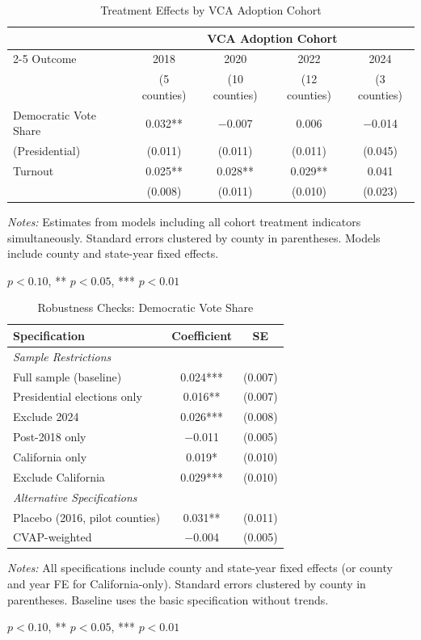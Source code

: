\begin{table}[htbp]
\centering
\caption{Treatment Effects by VCA Adoption Cohort}
\label{tab:cohort}
\begin{tabular}{lcccc}
\toprule
& \multicolumn{4}{c}{VCA Adoption Cohort} \\
\cmidrule(lr){2-5}
Outcome & 2018 & 2020 & 2022 & 2024 \\
& (5 counties) & (10 counties) & (12 counties) & (3 counties) \\
\midrule
Democratic Vote Share & 0.032** & $-$0.007 & 0.006 & $-$0.014 \\
(Presidential) & (0.011) & (0.011) & (0.011) & (0.045) \\[0.5em]
Turnout & 0.025** & 0.028** & 0.029** & 0.041 \\
& (0.008) & (0.011) & (0.010) & (0.023) \\
\bottomrule
\end{tabular}
\begin{tablenotes}
\small
\item \textit{Notes:} Estimates from models including all cohort treatment indicators simultaneously. Standard errors clustered by county in parentheses. Models include county and state-year fixed effects.
\item * $p<0.10$, ** $p<0.05$, *** $p<0.01$
\end{tablenotes}
\end{table}


\begin{table}[htbp]
\centering
\caption{Robustness Checks: Democratic Vote Share}
\label{tab:robustness}
\begin{tabular}{lcc}
\toprule
Specification & Coefficient & SE \\
\midrule
\multicolumn{3}{l}{\textit{Sample Restrictions}} \\
Full sample (baseline) & 0.024*** & (0.007) \\
Presidential elections only & 0.016** & (0.007) \\
Exclude 2024 & 0.026*** & (0.008) \\
Post-2018 only & $-$0.011 & (0.005) \\
California only & 0.019* & (0.010) \\
Exclude California & 0.029*** & (0.010) \\[0.5em]
\multicolumn{3}{l}{\textit{Alternative Specifications}} \\
Placebo (2016, pilot counties) & 0.031** & (0.011) \\
CVAP-weighted & $-$0.004 & (0.005) \\
\bottomrule
\end{tabular}
\begin{tablenotes}
\small
\item \textit{Notes:} All specifications include county and state-year fixed effects (or county and year FE for California-only). Standard errors clustered by county in parentheses. Baseline uses the basic specification without trends.
\item * $p<0.10$, ** $p<0.05$, *** $p<0.01$
\end{tablenotes}
\end{table}
